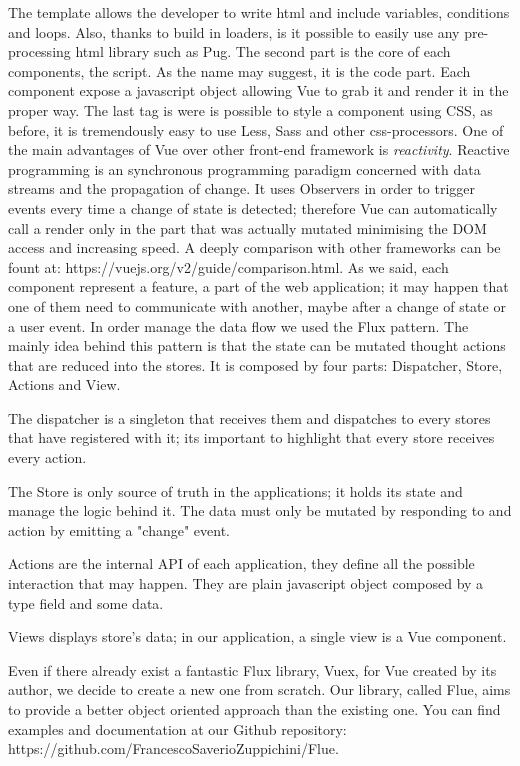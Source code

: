 \documentclass[]{usiinfbachelorproject}
\begin{document}
The template allows the developer to write html and include variables, conditions and loops. Also, thanks to build in loaders, is it possible to easily use any pre-processing html library such as Pug.
The second part is the core of each components, the script. As the name may suggest, it is the code part. Each component expose a javascript object allowing Vue to grab it and render it in the proper way.
The last tag is were is possible to style a component using CSS, as before, it is tremendously easy to use Less, Sass and other css-processors.
One of the main advantages of Vue over other front-end framework is \emph{reactivity}. Reactive programming is an synchronous programming paradigm concerned with data streams and the propagation of change. It uses Observers in order to trigger events every time a change of state is detected; therefore Vue can automatically call a render only in the part that was actually mutated minimising the DOM access and increasing speed.
A deeply comparison with other frameworks can be fount at: https://vuejs.org/v2/guide/comparison.html.
As we said, each component represent a feature, a part of the web application; it may happen that one of them need to communicate with another, maybe after a change of state or a user event. In order manage the data flow we used the Flux pattern. The mainly idea behind this pattern is that the state can be mutated thought actions that are reduced into the stores. It is composed by four parts: Dispatcher, Store, Actions and View.

The dispatcher is a singleton that receives them and dispatches to every stores that have registered with it; its important to highlight that every store receives every action.

The Store is only source of truth in the applications; it holds its state and manage the logic behind it. The data must only be mutated by responding to and action by emitting a "change" event.

Actions are the internal API of each application, they define all the possible interaction that may happen. They are plain javascript object composed by a type field and some data.

Views displays store's data; in our application, a single view is a Vue component.

Even if there already exist a fantastic Flux library, Vuex, for Vue created by its author, we decide to create a new one from scratch. Our library, called Flue, aims to provide a better object oriented approach than the existing one. You can find examples and documentation at our Github repository: https://github.com/FrancescoSaverioZuppichini/Flue.
\end{document}
